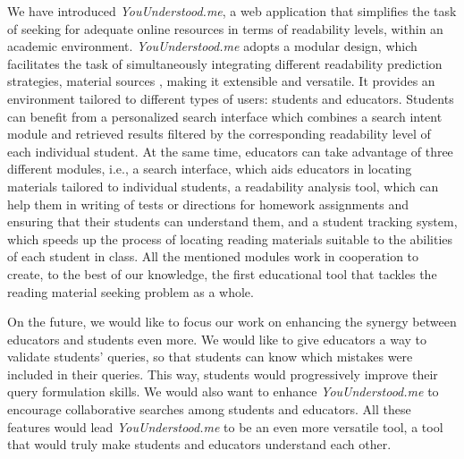 \documentclass{sig-alternate-05-2015}
\begin{document}
\noindent
We have introduced \textit{YouUnderstood.me}, a web application that simplifies the task of seeking for adequate online resources in terms of readability levels, within an academic environment. \textit{YouUnderstood.me} adopts a modular design, which facilitates the task of simultaneously integrating different readability prediction strategies, material sources
, making it extensible and versatile. It provides an environment tailored to different types of users: students and educators. Students can benefit from a personalized search interface which combines a search intent module and retrieved results filtered by the corresponding readability level %
of each individual student. At the same time, educators can take advantage of three different modules, i.e., a search interface, which aids educators in locating materials tailored to individual students, a readability analysis tool, which can help them in writing of tests or directions for homework assignments and ensuring that their students can understand them, and a student tracking system,  which speeds up the process of locating reading materials suitable to the abilities of each student in class. All the mentioned modules work in cooperation to create, to the best of our knowledge, the first educational tool that tackles the reading material seeking problem as a whole.

On the future, we would like to focus our work on enhancing the synergy between educators and students even more. We would like to give educators a way to validate students' queries, so that students can know which mistakes were included in their queries. This way, students would progressively improve their query formulation skills. We would also want to enhance \textit{YouUnderstood.me} to encourage collaborative searches among students and educators.  All these features would lead \textit{YouUnderstood.me} to be an even more versatile tool, a tool that would truly make students and educators understand each other.








\end{document}
